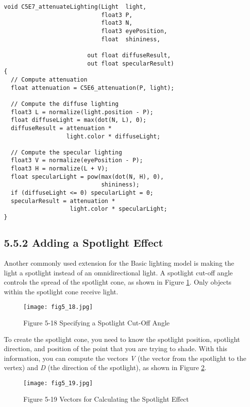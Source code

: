 \documentclass[../main.tex]{subfiles}
\begin{document}
\FloatBarrier
\begin{lstlisting}[caption=Example 5-7. The C5E7_attenuateLighting Internal Function]
void C5E7_attenuateLighting(Light  light,
                            float3 P,
                            float3 N,
                            float3 eyePosition,
                            float  shininess,

                        out float diffuseResult,
                        out float specularResult)
{
  // Compute attenuation
  float attenuation = C5E6_attenuation(P, light);

  // Compute the diffuse lighting
  float3 L = normalize(light.position - P);
  float diffuseLight = max(dot(N, L), 0);
  diffuseResult = attenuation *
                  light.color * diffuseLight;

  // Compute the specular lighting
  float3 V = normalize(eyePosition - P);
  float3 H = normalize(L + V);
  float specularLight = pow(max(dot(N, H), 0),
                            shininess);
  if (diffuseLight <= 0) specularLight = 0;
  specularResult = attenuation *
                   light.color * specularLight;
}
\end{lstlisting}
\FloatBarrier

\subsection{5.5.2 Adding a Spotlight Effect}

Another commonly used extension for the Basic lighting model is making the light a spotlight instead of an omnidirectional light. A spotlight cut-off angle controls the spread of the spotlight cone, as shown in Figure \ref{fig:5-18}. Only objects within the spotlight cone receive light.

\begin{figure}
    \centering
    \texttt{[image: fig5\_18.jpg]}
    \caption{Figure 5-18 Specifying a Spotlight Cut-Off Angle}
    \label{fig:5-18}
\end{figure}

To create the spotlight cone, you need to know the spotlight position, spotlight direction, and position of the point that you are trying to shade. With this information, you can compute the vectors \textit{V} (the vector from the spotlight to the vertex) and \textit{D} (the direction of the spotlight), as shown in Figure \ref{fig:5-19}.

\begin{figure}
    \centering
    \texttt{[image: fig5\_19.jpg]}
    \caption{Figure 5-19 Vectors for Calculating the Spotlight Effect}
    \label{fig:5-19}
\end{figure}
\end{document}
